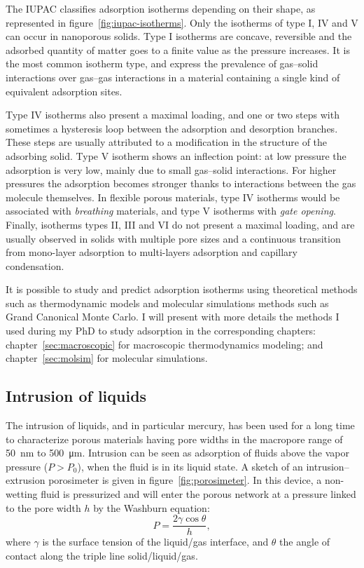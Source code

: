 \documentclass[thesis]{subfiles}
\begin{document}
The IUPAC classifies adsorption isotherms depending on their shape, as
represented in figure~\ref{fig:iupac-isotherms}\cite{Sing1985}. Only the
isotherms of type I, IV and V can occur in nanoporous solids. Type I isotherms
are concave, reversible and the adsorbed quantity of matter goes to a finite
value as the pressure increases. It is the most common isotherm type, and
express the prevalence of gas--solid interactions over gas--gas interactions in
a material containing a single kind of equivalent adsorption sites.

Type IV isotherms also present a maximal loading, and one or two steps with
sometimes a hysteresis loop between the adsorption and desorption branches.
These steps are usually attributed to a modification in the structure of the
adsorbing solid\cite{Karge1989}. Type V isotherm shows an inflection point: at
low pressure the adsorption is very low, mainly due to small gas--solid
interactions. For higher pressures the adsorption becomes stronger thanks to
interactions between the gas molecule themselves. In flexible porous materials,
type IV isotherms would be associated with \emph{breathing} materials, and type
V isotherms with \emph{gate opening}. Finally, isotherms types II, III and VI do
not present a maximal loading, and are usually observed in solids with multiple
pore sizes and a continuous transition from mono-layer adsorption to
multi-layers adsorption and capillary condensation.

It is possible to study and predict adsorption isotherms using theoretical
methods such as thermodynamic models and molecular simulations methods such as
Grand Canonical Monte Carlo. I will present with more details the methods I used
during my PhD to study adsorption in the corresponding chapters:
chapter~\ref{sec:macroscopic} for macroscopic thermodynamics modeling; and
chapter~\ref{sec:molsim} for molecular simulations.

\subsection{Intrusion of liquids}

The intrusion of liquids, and in particular mercury, has been used for a long
time to characterize porous materials having pore widths in the macropore range
of \SI{50}{nm} to \SI{500}{\um}\cite{Rouquerol2011}. Intrusion can be seen as
adsorption of fluids above the vapor pressure ($P > P_0$), \ie when the fluid is
in its liquid state. A sketch of an intrusion--extrusion porosimeter is given in
figure~\ref{fig:porosimeter}. In this device, a non-wetting fluid is pressurized
and will enter the porous network at a pressure linked to the pore width $h$ by
the Washburn equation\cite{Fraux2017-2}:
\[P = \frac{2\gamma\cos\theta}{h},\]
where $\gamma$ is the surface tension of the liquid/gas interface, and $\theta$
the angle of contact along the triple line solid/liquid/gas.
\end{document}
